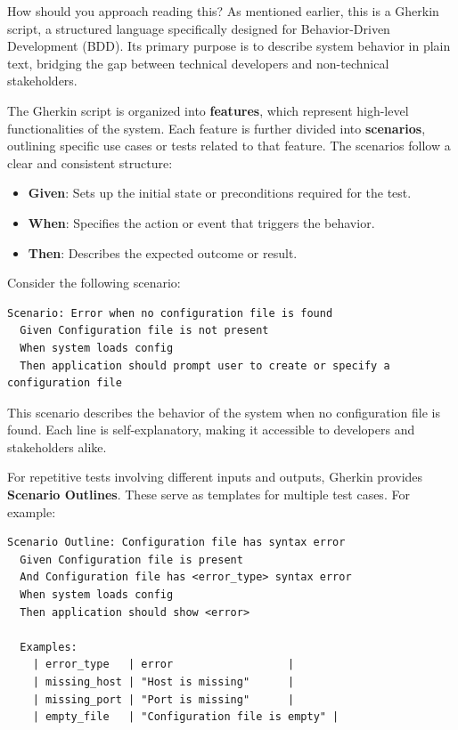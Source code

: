 \documentclass[10pt , a4paper]{report}
\begin{document}
How should you approach reading this? As mentioned earlier, this is a Gherkin script, a structured language specifically designed for Behavior-Driven Development (BDD). Its primary purpose is to describe system behavior in plain text, bridging the gap between technical developers and non-technical stakeholders.

\newpage
The Gherkin script is organized into \textbf{features}, which represent high-level functionalities of the system. Each feature is further divided into \textbf{scenarios}, outlining specific use cases or tests related to that feature. The scenarios follow a clear and consistent structure:

\begin{itemize}
  \item \textbf{Given}: Sets up the initial state or preconditions required for the test.
  \item \textbf{When}: Specifies the action or event that triggers the behavior.
  \item \textbf{Then}: Describes the expected outcome or result.
\end{itemize}

Consider the following scenario:

\begin{verbatim}
Scenario: Error when no configuration file is found
  Given Configuration file is not present
  When system loads config
  Then application should prompt user to create or specify a configuration file
\end{verbatim}

This scenario describes the behavior of the system when no configuration file is found. Each line is self-explanatory, making it accessible to developers and stakeholders alike.

For repetitive tests involving different inputs and outputs, Gherkin provides \textbf{Scenario Outlines}. These serve as templates for multiple test cases. For example:

\begin{verbatim}
Scenario Outline: Configuration file has syntax error
  Given Configuration file is present
  And Configuration file has <error_type> syntax error
  When system loads config
  Then application should show <error>

  Examples:
    | error_type   | error                  |
    | missing_host | "Host is missing"      |
    | missing_port | "Port is missing"      |
    | empty_file   | "Configuration file is empty" |
\end{verbatim}
\end{document}
